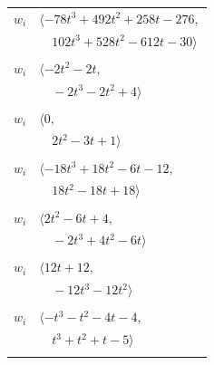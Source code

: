 \documentclass[11pt]{article}
\begin{document}
\begin{longtable}{@{}ll@{}}
$w_i$ & $\langle -78t^{3}+492t^{2}+258t-276,$\\
 & $\quad 102t^{3}+528t^{2}-612t-30\rangle$\\
\addlinespace[2pt]
\multicolumn{2}{@{}p{0.97\textwidth}@{}}{$i=26$, $D_i=1$, $\rho_{ij}$: $1{:}1, \allowbreak 14{:}1, \allowbreak 30{:}2, \allowbreak 37{:}1, \allowbreak 43{:}2$}\\
$w_i$ & $\langle -2t^{2}-2t,$\\
 & $\quad -2t^{3}-2t^{2}+4\rangle$\\
\addlinespace[2pt]
\multicolumn{2}{@{}p{0.97\textwidth}@{}}{$i=27$, $D_i=1$, $\rho_{ij}$: $1{:}2, \allowbreak 11{:}1, \allowbreak 20{:}2, \allowbreak 33{:}2, \allowbreak 34{:}1, \allowbreak 40{:}2$}\\
$w_i$ & $\langle 0,$\\
 & $\quad 2t^{2}-3t+1\rangle$\\
\addlinespace[2pt]
\multicolumn{2}{@{}p{0.97\textwidth}@{}}{$i=28$, $D_i=1$, $\rho_{ij}$: $2{:}2, \allowbreak 10{:}2, \allowbreak 15{:}2, \allowbreak 24{:}2, \allowbreak 39{:}2, \allowbreak 45{:}1$}\\
$w_i$ & $\langle -18t^{3}+18t^{2}-6t-12,$\\
 & $\quad 18t^{2}-18t+18\rangle$\\
\addlinespace[2pt]
\multicolumn{2}{@{}p{0.97\textwidth}@{}}{$i=29$, $D_i=1$, $\rho_{ij}$: $7{:}2, \allowbreak 11{:}1, \allowbreak 13{:}2, \allowbreak 14{:}1, \allowbreak 42{:}2, \allowbreak 44{:}1$}\\
$w_i$ & $\langle 2t^{2}-6t+4,$\\
 & $\quad -2t^{3}+4t^{2}-6t\rangle$\\
\addlinespace[2pt]
\multicolumn{2}{@{}p{0.97\textwidth}@{}}{$i=30$, $D_i=1$, $\rho_{ij}$: $4{:}1, \allowbreak 8{:}2, \allowbreak 9{:}1, \allowbreak 10{:}1, \allowbreak 16{:}1, \allowbreak 22{:}1, \allowbreak 25{:}2, \allowbreak 26{:}1, \allowbreak 37{:}1, \allowbreak 39{:}2, \allowbreak 44{:}1$}\\
$w_i$ & $\langle 12t+12,$\\
 & $\quad -12t^{3}-12t^{2}\rangle$\\
\addlinespace[2pt]
\multicolumn{2}{@{}p{0.97\textwidth}@{}}{$i=31$, $D_i=1$, $\rho_{ij}$: $3{:}1, \allowbreak 39{:}2, \allowbreak 40{:}2, \allowbreak 43{:}1$}\\
$w_i$ & $\langle -t^{3}-t^{2}-4t-4,$\\
 & $\quad t^{3}+t^{2}+t-5\rangle$\\
\addlinespace[2pt]
\multicolumn{2}{@{}p{0.97\textwidth}@{}}{$i=32$, $D_i=1$, $\rho_{ij}$: $3{:}2, \allowbreak 4{:}2, \allowbreak 35{:}1, \allowbreak 37{:}2, \allowbreak 40{:}1, \allowbreak 43{:}2$}\\

\end{longtable}
\end{document}
